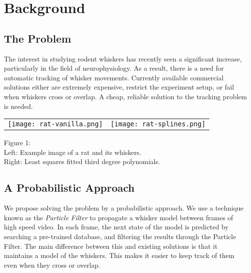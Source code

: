 \section*{Background}
\subsection*{The Problem}
The interest in studying rodent whiskers has recently seen a significant increase, particularly in the field of neurophysiology. As a result, there is a need for automatic tracking of whisker movements. Currently available commercial solutions either are extremely expensive, restrict the experiment setup, or fail when whiskers cross or overlap. A cheap, reliable solution to the tracking problem is needed.

\begin{center}
  \begin{tabular}{rl}
    \texttt{[image: rat-vanilla.png]}
    & \texttt{[image: rat-splines.png]}
    \label{fig:rat}
  \end{tabular}
  
  Figure 1:\\
  Left: Example image of a rat and its whiskers.\\
  Right: Least squares fitted third degree polynomials.
\end{center}

\subsection*{A Probabilistic Approach}
We propose solving the problem by a probabilistic approach. We use a technique known as the \emph{Particle Filter} to propagate a whisker model between frames of high speed video. In each frame, the next state of the model is predicted by searching a pre-trained database, and filtering the results through the Particle Filter. The main difference between this and existing solutions is that it maintains a model of the whiskers. This makes it easier to keep track of them even when they cross or overlap.
